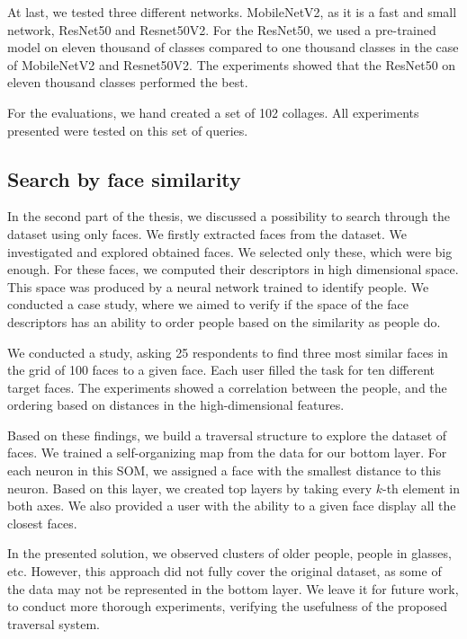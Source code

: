 At last, we tested three different networks. MobileNetV2, as it is a fast and small network, ResNet50 and Resnet50V2. For the ResNet50, we used a pre-trained model on eleven thousand of classes compared to one thousand classes in the case of MobileNetV2 and Resnet50V2. The experiments showed that the ResNet50 on eleven thousand classes performed the best.

For the evaluations, we hand created a set of 102 collages. All experiments presented were tested on this set of queries.

\subsection*{Search by face similarity}

In the second part of the thesis, we discussed a possibility to search through the dataset using only faces. We firstly extracted faces from the dataset. We investigated and explored obtained faces. We selected only these, which were big enough. For these faces, we computed their descriptors in high dimensional space. This space was produced by a neural network trained to identify people. We conducted a case study, where we aimed to verify if the space of the face descriptors has an ability to order people based on the similarity as people do.

We conducted a study, asking 25 respondents to find three most similar faces in the grid of 100 faces to a given face. Each user filled the task for ten different target faces. The experiments showed a correlation between the people, and the ordering based on distances in the high-dimensional features.

Based on these findings, we build a traversal structure to explore the dataset of faces. We trained a self-organizing map from the data for our bottom layer. For each neuron in this SOM, we assigned a face with the smallest distance to this neuron. Based on this layer, we created top layers by taking every $k$-th element in both axes. We also provided a user with the ability to a given face display all the closest faces.

In the presented solution, we observed clusters of older people, people in glasses, etc. However, this approach did not fully cover the original dataset, as some of the data may not be represented in the bottom layer. We leave it for future work, to conduct more thorough experiments, verifying the usefulness of the proposed traversal system.

\vspace{1em}

